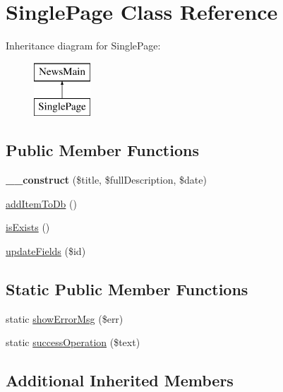 \hypertarget{class_single_page}{}\section{Single\+Page Class Reference}
\label{class_single_page}
Inheritance diagram for Single\+Page\+:\begin{figure}[H]
\begin{center}
\leavevmode
\includegraphics[height=2.000000cm]{class_single_page}
\end{center}
\end{figure}
\subsection*{Public Member Functions}
\begin{DoxyCompactItemize}
\item 
\hypertarget{class_single_page_a08bbb3202c1238d4f1d53b7c8db9d26e}{}{\bfseries \+\_\+\+\_\+construct} (\$title, \$full\+Description, \$date)\label{class_single_page_a08bbb3202c1238d4f1d53b7c8db9d26e}

\item 
\hyperlink{class_single_page_aad600c9a2023020967610d3492a6c0e0}{add\+Item\+To\+Db} ()
\item 
\hyperlink{class_single_page_aed844dd8a243f1cfa782c176992a44d8}{is\+Exists} ()
\item 
\hyperlink{class_single_page_a19d08bdfd19c90288ad30800cf2789f1}{update\+Fields} (\$id)
\end{DoxyCompactItemize}
\subsection*{Static Public Member Functions}
\begin{DoxyCompactItemize}
\item 
static \hyperlink{class_single_page_a09b7b0d3e12a58217c4ce3ff9471057d}{show\+Error\+Msg} (\$err)
\item 
static \hyperlink{class_single_page_a8cc0f8e305092738dd124bb746383bcd}{success\+Operation} (\$text)
\end{DoxyCompactItemize}
\subsection*{Additional Inherited Members}


